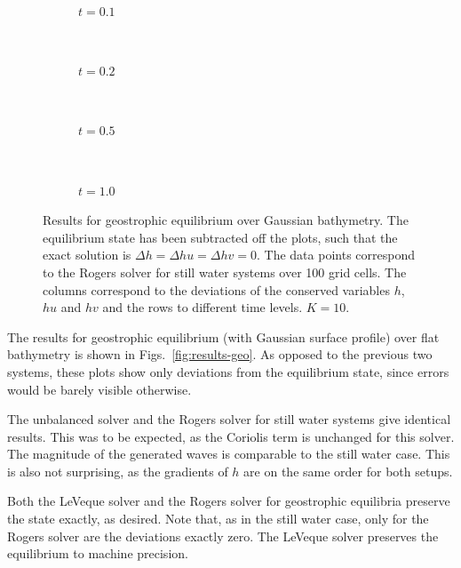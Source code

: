 \begin{figure}
  \centering
  \begin{subfigure}{\textwidth}
    \caption{$t = 0.1$}
    \label{fig:results-geo-gauss-1}
  \end{subfigure} \\
  \begin{subfigure}{\textwidth}
    \caption{$t = 0.2$}
    \label{fig:results-geo-gauss-2}
  \end{subfigure} \\
  \begin{subfigure}{\textwidth}
    \caption{$t = 0.5$}
    \label{fig:results-geo-gauss-5}
  \end{subfigure} \\
  \begin{subfigure}{\textwidth}
    \caption{$t = 1.0$}
    \label{fig:results-geo-gauss-10}
  \end{subfigure}
  \caption{Results for geostrophic equilibrium over Gaussian bathymetry. The equilibrium state has been subtracted off the plots, such that the exact solution is $\Delta h = \Delta hu = \Delta hv = 0$. The data points correspond to the Rogers solver for still water systems over 100 grid cells. The columns correspond to the deviations of the conserved variables $h$, $hu$ and $hv$ and the rows to different time levels. $K = 10$.}
  \label{fig:results-geo-gauss}
\end{figure}

The results for geostrophic equilibrium (with Gaussian surface profile) over flat bathymetry is shown in Figs.~\ref{fig:results-geo}. As opposed to the previous two systems, these plots show only deviations from the equilibrium state, since errors would be barely visible otherwise.

The unbalanced solver and the Rogers solver for still water systems give identical results. This was to be expected, as the Coriolis term is unchanged for this solver. The magnitude of the generated waves is comparable to the still water case. This is also not surprising, as the gradients of $h$ are on the same order for both setups.

Both the LeVeque solver and the Rogers solver for geostrophic equilibria preserve the state exactly, as desired. Note that, as in the still water case, only for the Rogers solver are the deviations exactly zero. The LeVeque solver preserves the equilibrium to machine precision.

